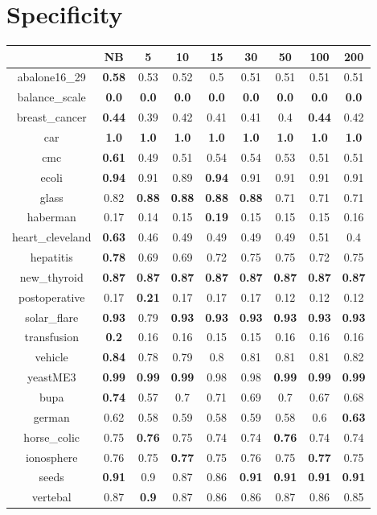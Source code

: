 \documentclass{article}%
\begin{document}
%
\section*{Specificity}%
\begin{tabular}{c|cccccccc}%
\hline%
&NB&5&10&15&30&50&100&200\\%
\hline%
abalone16\_29&\textbf{0.58}&0.53&0.52&0.5&0.51&0.51&0.51&0.51\\%
\hline%
balance\_scale&\textbf{0.0}&\textbf{0.0}&\textbf{0.0}&\textbf{0.0}&\textbf{0.0}&\textbf{0.0}&\textbf{0.0}&\textbf{0.0}\\%
\hline%
breast\_cancer&\textbf{0.44}&0.39&0.42&0.41&0.41&0.4&\textbf{0.44}&0.42\\%
\hline%
car&\textbf{1.0}&\textbf{1.0}&\textbf{1.0}&\textbf{1.0}&\textbf{1.0}&\textbf{1.0}&\textbf{1.0}&\textbf{1.0}\\%
\hline%
cmc&\textbf{0.61}&0.49&0.51&0.54&0.54&0.53&0.51&0.51\\%
\hline%
ecoli&\textbf{0.94}&0.91&0.89&\textbf{0.94}&0.91&0.91&0.91&0.91\\%
\hline%
glass&0.82&\textbf{0.88}&\textbf{0.88}&\textbf{0.88}&\textbf{0.88}&0.71&0.71&0.71\\%
\hline%
haberman&0.17&0.14&0.15&\textbf{0.19}&0.15&0.15&0.15&0.16\\%
\hline%
heart\_cleveland&\textbf{0.63}&0.46&0.49&0.49&0.49&0.49&0.51&0.4\\%
\hline%
hepatitis&\textbf{0.78}&0.69&0.69&0.72&0.75&0.75&0.72&0.75\\%
\hline%
new\_thyroid&\textbf{0.87}&\textbf{0.87}&\textbf{0.87}&\textbf{0.87}&\textbf{0.87}&\textbf{0.87}&\textbf{0.87}&\textbf{0.87}\\%
\hline%
postoperative&0.17&\textbf{0.21}&0.17&0.17&0.17&0.12&0.12&0.12\\%
\hline%
solar\_flare&\textbf{0.93}&0.79&\textbf{0.93}&\textbf{0.93}&\textbf{0.93}&\textbf{0.93}&\textbf{0.93}&\textbf{0.93}\\%
\hline%
transfusion&\textbf{0.2}&0.16&0.16&0.15&0.15&0.16&0.16&0.16\\%
\hline%
vehicle&\textbf{0.84}&0.78&0.79&0.8&0.81&0.81&0.81&0.82\\%
\hline%
yeastME3&\textbf{0.99}&\textbf{0.99}&\textbf{0.99}&0.98&0.98&\textbf{0.99}&\textbf{0.99}&\textbf{0.99}\\%
\hline%
bupa&\textbf{0.74}&0.57&0.7&0.71&0.69&0.7&0.67&0.68\\%
\hline%
german&0.62&0.58&0.59&0.58&0.59&0.58&0.6&\textbf{0.63}\\%
\hline%
horse\_colic&0.75&\textbf{0.76}&0.75&0.74&0.74&\textbf{0.76}&0.74&0.74\\%
\hline%
ionosphere&0.76&0.75&\textbf{0.77}&0.75&0.76&0.75&\textbf{0.77}&0.75\\%
\hline%
seeds&\textbf{0.91}&0.9&0.87&0.86&\textbf{0.91}&\textbf{0.91}&\textbf{0.91}&\textbf{0.91}\\%
\hline%
vertebal&0.87&\textbf{0.9}&0.87&0.86&0.86&0.87&0.86&0.85\\%
\hline%
\end{tabular}
\end{document}
